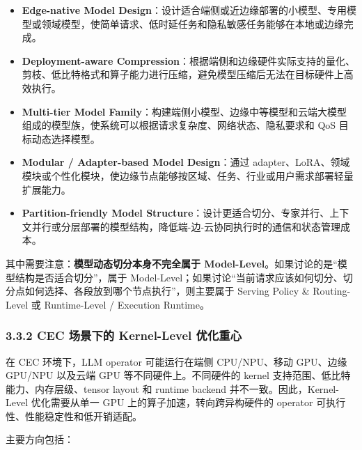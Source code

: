 \documentclass[a4paper,10pt]{ctexart}
\begin{document}
\begin{itemize}
\item \textbf{Edge-native Model Design}：设计适合端侧或近边缘部署的小模型、专用模型或领域模型，使简单请求、低时延任务和隐私敏感任务能够在本地或边缘完成。

\item \textbf{Deployment-aware Compression}：根据端侧和边缘硬件实际支持的量化、剪枝、低比特格式和算子能力进行压缩，避免模型压缩后无法在目标硬件上高效执行。

\item \textbf{Multi-tier Model Family}：构建端侧小模型、边缘中等模型和云端大模型组成的模型族，使系统可以根据请求复杂度、网络状态、隐私要求和 QoS 目标动态选择模型。

\item \textbf{Modular / Adapter-based Model Design}：通过 adapter、LoRA、领域模块或个性化模块，使边缘节点能够按区域、任务、行业或用户需求部署轻量扩展能力。

\item \textbf{Partition-friendly Model Structure}：设计更适合切分、专家并行、上下文并行或分层部署的模型结构，降低端-边-云协同执行时的通信和状态管理成本。



\end{itemize}
其中需要注意：\textbf{模型动态切分本身不完全属于 Model-Level}。如果讨论的是“模型结构是否适合切分”，属于 Model-Level；如果讨论“当前请求应该如何切分、切分点如何选择、各段放到哪个节点执行”，则主要属于 Serving Policy \& Routing-Level 或 Runtime-Level / Execution Runtime。








\subsubsection*{3.3.2 CEC 场景下的 Kernel-Level 优化重心}



在 CEC 环境下，LLM operator 可能运行在端侧 CPU/NPU、移动 GPU、边缘 GPU/NPU 以及云端 GPU 等不同硬件上。不同硬件的 kernel 支持范围、低比特能力、内存层级、tensor layout 和 runtime backend 并不一致。因此，Kernel-Level 优化需要从单一 GPU 上的算子加速，转向跨异构硬件的 operator 可执行性、性能稳定性和低开销适配。




主要方向包括：
\end{document}
